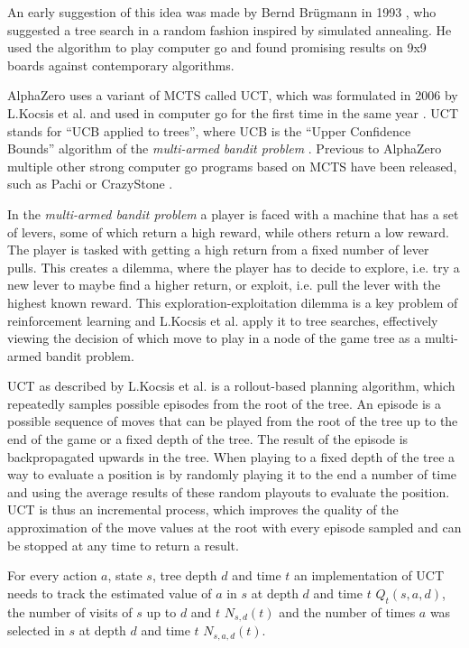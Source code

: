 \documentclass[12pt,onecolumn,oneside,titlepage]{article}
\begin{document}
An early suggestion of this idea was made by Bernd Brügmann in 1993 \cite{montecarlogo1993}, who suggested a tree search in a random fashion inspired by simulated annealing. He used the algorithm to play computer go and found promising results on 9x9 boards against contemporary algorithms.

AlphaZero uses a variant of MCTS called UCT, which was formulated in 2006 \cite{kocsis2006bandit} by L.Kocsis et al. and used in computer go for the first time in the same year \cite{gelly2006modification}.
UCT stands for ``UCB applied to trees'', where UCB is the ``Upper Confidence Bounds'' algorithm of the \emph{multi-armed bandit problem} \cite{auer2002finite}. 
Previous to AlphaZero multiple other strong computer go programs based on MCTS have been released, such as Pachi \cite{pachi_github} or CrazyStone \cite{crazystone}.


In the \emph{multi-armed bandit problem} a player is faced with a machine that has a set of levers, some of which return a high reward, while others return a low reward. The player is tasked with getting a high return from a fixed number of lever pulls.
This creates a dilemma, where the player has to decide to explore, i.e. try a new lever to maybe find a higher return, or exploit, i.e. pull the lever with the highest known reward. This exploration-exploitation dilemma is a key problem of reinforcement learning
and L.Kocsis et al. \cite{kocsis2006bandit} apply it to tree searches, effectively viewing the decision of which move to play in a node of the game tree as a multi-armed bandit problem.

UCT as described by L.Kocsis et al. is a rollout-based planning algorithm, which repeatedly samples possible episodes from the root of the tree. An episode is a possible sequence of moves that can be played from the root of the tree up to the end of the game or a fixed depth of the tree. The result
of the episode is backpropagated upwards in the tree. When playing to a fixed depth of the tree a way to evaluate a position is by randomly playing it to the end a number of time and using the average results of these random playouts to evaluate the position.
UCT is thus an incremental process, which improves the quality of the approximation of the move values at the root with every episode sampled and can be stopped at any time to return a result.

For every action $a$, state $s$, tree depth $d$ and time $t$ an implementation of UCT needs to track the estimated value of $a$ in $s$ at depth $d$ and time $t$ $Q_t(s,a,d)$, the number of visits of $s$ up to $d$ and $t$ $N_{s,d}(t)$ and the number of times
$a$ was selected in $s$ at depth $d$ and time $t$ $N_{s,a,d}(t)$.
\end{document}
